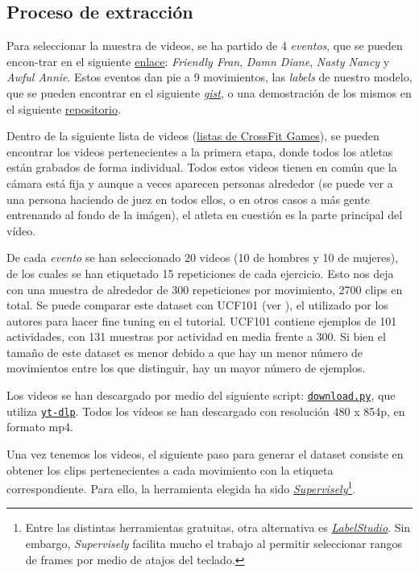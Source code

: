 \subsection{Proceso de extracción}

Para seleccionar la muestra de videos, se ha partido de 4 \textit{eventos}, que se pueden encon-trar en el siguiente \href{https://games.crossfit.com/workouts/games/2020}{enlace}: \textit{Friendly Fran}, \textit{Damn Diane}, \textit{Nasty Nancy} y \textit{Awful Annie}. Estos eventos dan pie a 9 movimientos, las \textit{labels} de nuestro modelo, que se pueden encontrar en el siguiente \href{https://gist.github.com/plaguss/58091caefee6acb39ae51cbc241b3cf9/raw/labels.txt}{\textit{gist}}, o una demostración de los mismos en el siguiente \href{https://github.com/plaguss/tfm-misc}{repositorio}.

Dentro de la siguiente lista de videos (\href{https://www.youtube.com/c/CrossFitGamesTV/playlists}{listas de CrossFit Games}), se pueden encontrar los videos pertenecientes a la primera etapa, donde todos los atletas están grabados de forma individual. Todos estos videos tienen en común que la cámara está fija y aunque a veces aparecen personas alrededor (se puede ver a una persona haciendo de juez en todos ellos, o en otros casos a más gente entrenando al fondo de la imágen), el atleta en cuestión es la parte principal del vídeo.

De cada \textit{evento} se han seleccionado 20 videos (10 de hombres y 10 de mujeres), de los cuales se han etiquetado 15 repeticiones de cada ejercicio. Esto nos deja con una muestra de alrededor de 300 repeticiones por movimiento, 2700 clips en total. Se puede comparar este dataset con UCF101 (ver \cite{UCF101}), el utilizado por los autores para hacer fine tuning en el tutorial. UCF101 contiene ejemplos de 101 actividades, con 131 muestras por actividad en media frente a 300. Si bien el tamaño de este dataset es menor debido a que hay un menor número de movimientos entre los que distinguir, hay un mayor número de ejemplos.

Los videos se han descargado por medio del siguiente script: \href{https://github.com/plaguss/tfm-misc/blob/main/scripts/download.py}{\texttt{download.py}}, que utiliza \href{https://github.com/yt-dlp/yt-dlp}{\texttt{yt-dlp}}. Todos los vídeos se han descargado con resolución 480 x 854p, en formato mp4.

Una vez tenemos los videos, el siguiente paso para generar el dataset consiste en obtener los clips pertenecientes a cada movimiento con la etiqueta correspondiente. Para ello, la herramienta elegida ha sido \href{https://supervise.ly/}{\textit{Supervisely}}\footnote{Entre las distintas herramientas gratuitas, otra alternativa es \href{https://labelstud.io/}{\textit{LabelStudio}}. Sin embargo, \textit{Supervisely} facilita mucho el trabajo al permitir seleccionar rangos de frames por medio de atajos del teclado.}.

